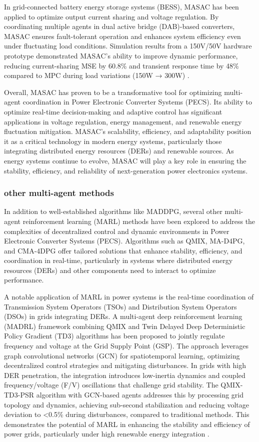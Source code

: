 In grid-connected battery energy storage systems (BESS), MASAC has been applied to optimize output current sharing and voltage regulation. By coordinating multiple agents in dual active bridge (DAB)-based converters, MASAC ensures fault-tolerant operation and enhances system efficiency even under fluctuating load conditions. Simulation results from a 150V/50V hardware prototype demonstrated MASAC's ability to improve dynamic performance, reducing current-sharing MSE by 60.8\% and transient response time by 48\% compared to MPC during load variations (150W → 300W) \cite{zeng2022multiagent}.

Overall, MASAC has proven to be a transformative tool for optimizing multi-agent coordination in Power Electronic Converter Systems (PECS). Its ability to optimize real-time decision-making and adaptive control has significant applications in voltage regulation, energy management, and renewable energy fluctuation mitigation. MASAC’s scalability, efficiency, and adaptability position it as a critical technology in modern energy systems, particularly those integrating distributed energy resources (DERs) and renewable sources. As energy systems continue to evolve, MASAC will play a key role in ensuring the stability, efficiency, and reliability of next-generation power electronics systems.

\subsubsection{other multi-agent methods}

In addition to well-established algorithms like MADDPG, several other multi-agent reinforcement learning (MARL) methods have been explored to address the complexities of decentralized control and dynamic environments in Power Electronic Converter Systems (PECS). Algorithms such as QMIX, MA-D4PG, and CMA-4DPG offer tailored solutions that enhance stability, efficiency, and coordination in real-time, particularly in systems where distributed energy resources (DERs) and other components need to interact to optimize performance.

A notable application of MARL in power systems is the real-time coordination of Transmission System Operators (TSOs) and Distribution System Operators (DSOs) in grids integrating DERs. A multi-agent deep reinforcement learning (MADRL) framework combining QMIX and Twin Delayed Deep Deterministic Policy Gradient (TD3) algorithms has been proposed to jointly regulate frequency and voltage at the Grid Supply Point (GSP). The approach leverages graph convolutional networks (GCN) for spatiotemporal learning, optimizing decentralized control strategies and mitigating disturbances. In grids with high DER penetration, the integration introduces low-inertia dynamics and coupled frequency/voltage (F/V) oscillations that challenge grid stability. The QMIX-TD3-PSR algorithm with GCN-based agents addresses this by processing grid topology and dynamics, achieving sub-second stabilization and reducing voltage deviation to <0.5\% during disturbances, compared to traditional methods. This demonstrates the potential of MARL in enhancing the stability and efficiency of power grids, particularly under high renewable energy integration \cite{zeng2023data}.

